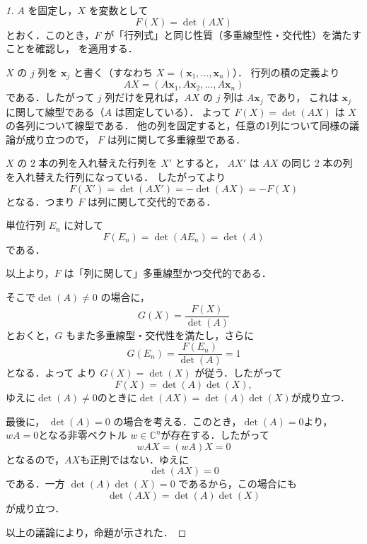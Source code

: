 \begin{leftbar}
\begin{proof}[1]
  $A$ を固定し，$X$ を変数として
  \[
    F(X)=  \det(AX)
  \]
  とおく．このとき，$F$ が「行列式」と同じ性質（多重線型性・交代性）を満たすことを確認し，
  を適用する．


  $X$ の $j$ 列を $\bm{x}_j$ と書く（すなわち $X=(\bm{x}_1,\dots,\bm{x}_n)$）．
  行列の積の定義より
  \[
    AX=(A\bm{x}_1,A\bm{x}_2,\dots,A\bm{x}_n)
  \]
  である．したがって $j$ 列だけを見れば，$AX$ の $j$ 列は $A\bm{x}_j$ であり，
  これは $\bm{x}_j$ に関して線型である（$A$ は固定している）．
  よって $F(X)=\det(AX)$ は $X$ の各列について線型である．
他の列を固定すると，任意の1列について同様の議論が成り立つので，
$F$ は列に関して多重線型である．

  $X$ の 2 本の列を入れ替えた行列を $X'$ とすると，
  $AX'$ は $AX$ の同じ 2 本の列を入れ替えた行列になっている．
  したがってより
  \[
    F(X')=\det(AX')=-\det(AX)=-F(X)
  \]
  となる．つまり $F$ は列に関して交代的である．

  単位行列 $E_n$ に対して
  \[
    F(E_n)=\det(AE_n)=\det(A)
  \]
  である．

  以上より，$F$ は「列に関して」多重線型かつ交代的である．

  \smallskip
  そこで$\det(A) \ne 0$ の場合に，
  \[
    G(X) = \frac{F(X)}{\det(A)}
  \]
  とおくと，$G$ もまた多重線型・交代性を満たし，さらに
  \[
    G(E_n)=\frac{F(E_n)}{\det(A)}=1
  \]
  となる．よって より $G(X)=\det(X)$ が従う．したがって
  \[
    F(X)=\det(A)\det(X),
  \]
  ゆえに$\det (A) \ne 0$のときに$\det(AX)=\det(A)\det(X)$が成り立つ．

  \smallskip
  
最後に， $\det(A)=0$ の場合を考える．このとき，$\det(A)=0$より，$wA=0$となる非零ベクトル
$w\in\mathbb{C}^n$が存在する．したがって
\[
wAX=(wA)X=0
\]
となるので，$AX$も正則ではない．ゆえに
\[
\det(AX)=0
\]
である．一方
$\det(A)\det(X)=0$
であるから，この場合にも
\[
\det(AX)=\det(A)\det(X)
\]
が成り立つ．

  以上の議論により，命題が示された．
\end{proof}
\end{leftbar}


